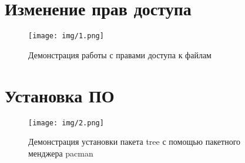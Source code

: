 \documentclass{gost}
\begin{document}
	\gostTitlePage

	\section{Изменение прав доступа}
		\begin{figure}[H]
			\texttt{[image: img/1.png]}
			\caption{Демонстрация работы с правами доступа к файлам}
		\end{figure}

	\section{Установка ПО}
		\begin{figure}[H]
			\texttt{[image: img/2.png]}
			\caption{Демонстрация установки пакета tree с помощью пакетного менджера
			pacman}
		\end{figure}
\end{document}
